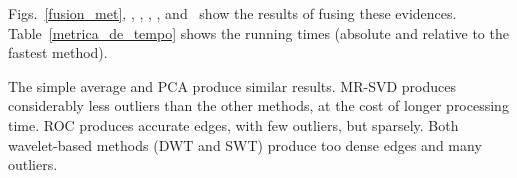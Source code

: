 \documentclass[journal]{IEEEtran}
\begin{document}
Figs.~\ref{fusion_met}, , , , , and~ show the results of fusing these evidences. 
Table~\ref{metrica_de_tempo} shows the running times (absolute and relative to the fastest method).


The simple average and PCA produce similar results.
MR-SVD produces considerably less outliers than the other methods, at the cost of longer processing time.
ROC produces accurate edges, with few outliers, but sparsely. 
Both wavelet-based methods (DWT and SWT) produce too dense edges and many outliers.

\end{document}
